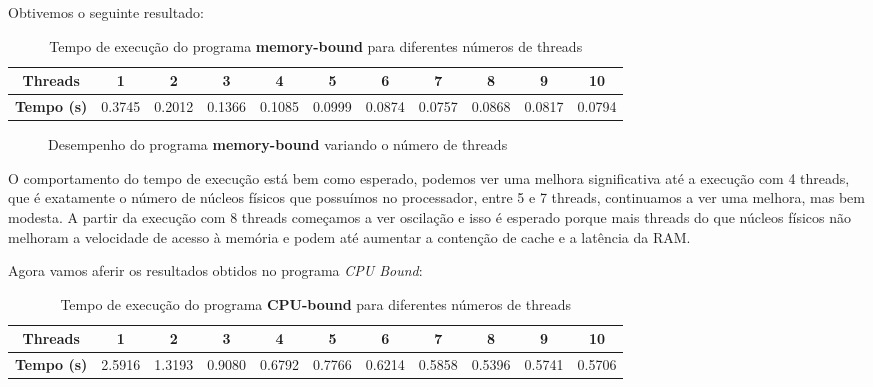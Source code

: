 \documentclass[a4paper, 12pt]{article}
\begin{document}
	Obtivemos o seguinte resultado:
		
	\begin{table}[h]
		\centering
		\begin{tabular}{|c|c|c|c|c|c|c|c|c|c|c|}
			\hline
			\textbf{Threads} & 1 & 2 & 3 & 4 & 5 & 6 & 7 & 8 & 9 & 10 \\
			\hline
			\textbf{Tempo (s)} & 0.3745 & 0.2012 & 0.1366 & 0.1085 & 0.0999 & 0.0874 & 0.0757 & 0.0868 & 0.0817 & 0.0794 \\
			\hline
		\end{tabular}
		\caption{Tempo de execução do programa \textbf{memory-bound} para diferentes números de threads}
		\label{tab:memory-bound}
	\end{table}
	
	\begin{figure}[h]
		\centering
		\caption{Desempenho do programa \textbf{memory-bound} variando o número de threads}
		\label{fig:memory-bound}
	\end{figure}
	
	O comportamento do tempo de execução está bem como esperado, podemos ver uma melhora significativa até a execução com 4 threads, que é exatamente o número de núcleos físicos que possuímos no processador, entre 5 e 7 threads, continuamos a ver uma melhora, mas bem modesta. A partir da execução com 8 threads começamos a ver oscilação e isso é esperado porque mais threads do que núcleos físicos não melhoram a velocidade de acesso à memória e podem até aumentar a contenção de cache e a latência da RAM.
	
	Agora vamos aferir os resultados obtidos no programa \textit{CPU Bound}: 
	
	\begin{table}[H]
		\centering
		\begin{tabular}{|c|c|c|c|c|c|c|c|c|c|c|}
			\hline
			\textbf{Threads} & 1 & 2 & 3 & 4 & 5 & 6 & 7 & 8 & 9 & 10 \\
			\hline
			\textbf{Tempo (s)} & 2.5916 & 1.3193 & 0.9080 & 0.6792 & 0.7766 & 0.6214 & 0.5858 & 0.5396 & 0.5741 & 0.5706 \\
			\hline
		\end{tabular}
		\caption{Tempo de execução do programa \textbf{CPU-bound} para diferentes números de threads}
		\label{tab:cpu-bound}
	\end{table}
	
\end{document}
